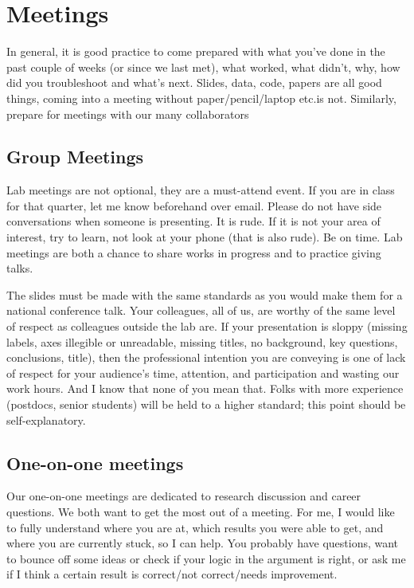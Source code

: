 \documentclass[12pt]{article}
\begin{document}
\section{Meetings}
In general, it is good practice to come prepared with what you've done in the past couple of weeks (or since we last met), what worked, what didn't, why, how did you troubleshoot and what's next.
Slides, data, code, papers are all good things, coming into a meeting without paper/pencil/laptop etc.\@ is not.
Similarly, prepare for meetings with our many collaborators

\subsection{Group Meetings}

Lab meetings are not optional, they are a must-attend event.
If you are in class for that quarter, let me know beforehand over email.
Please do not have side conversations when someone is presenting.
It is rude.
If it is not your area of interest, try to learn, not look at your phone (that is also rude).
Be on time.
Lab meetings are both a chance to share works in progress and to practice giving talks.

The slides must be made with the same standards as you would make them for a national conference talk.
Your colleagues, all of us, are worthy of the same level of respect as colleagues outside the lab are.
If your presentation is sloppy (missing labels, axes illegible or unreadable, missing titles, no background, key questions, conclusions, title), then the professional intention you are conveying is one of lack of respect for your audience's time, attention, and participation and wasting our work hours.
And I know that none of you mean that.
Folks with more experience (postdocs, senior students) will be held to a higher standard; this point should be self-explanatory.

\subsection{One-on-one meetings}

Our one-on-one meetings are dedicated to research discussion and career questions.
We both want to get the most out of a meeting.
For me, I would like to fully understand where you are at, which results you were able to get, and where you are currently stuck, so I can help.
You probably have questions, want to bounce off some ideas or check if your logic in the argument is right, or ask me if I think a certain result is correct/not correct/needs improvement.
\end{document}
